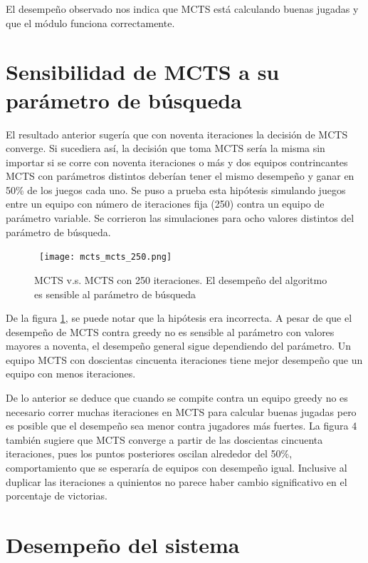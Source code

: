 El desempeño observado nos indica que MCTS está calculando buenas jugadas y que el 
módulo funciona correctamente.

\section{Sensibilidad de MCTS a su parámetro de búsqueda}

El resultado anterior sugería que con noventa iteraciones la decisión de MCTS converge. Si 
sucediera así, la decisión que toma MCTS sería la misma sin importar si se corre con 
noventa iteraciones o más y dos equipos contrincantes MCTS con parámetros distintos 
deberían tener el mismo desempeño y ganar en 50\% de los juegos cada uno. Se puso a 
prueba esta hipótesis simulando juegos entre un equipo con número de iteraciones fija 
(250) contra un equipo de parámetro variable. Se corrieron las simulaciones para ocho 
valores distintos del parámetro de búsqueda.

\begin{figure}[ht]
\begin{center}
\hbox{\hspace{-1.5em} \texttt{[image: mcts\_mcts\_250.png]}}
\caption{MCTS v.s. MCTS con 250 iteraciones. El desempeño del algoritmo es sensible al parámetro de búsqueda}
\label{MM250}
\end{center}
\end{figure}


De la figura \ref{MM250}, se puede notar que la hipótesis era incorrecta. A pesar de que el 
desempeño de MCTS contra greedy no es sensible al parámetro con valores mayores a 
noventa, el desempeño general sigue dependiendo del parámetro. Un equipo MCTS con 
doscientas cincuenta iteraciones tiene mejor desempeño que un equipo con menos 
iteraciones.

De lo anterior se deduce que cuando se compite contra un equipo greedy no es necesario 
correr muchas iteraciones en MCTS para calcular buenas jugadas pero es posible que el 
desempeño sea menor contra jugadores más fuertes. La figura 4 también sugiere que MCTS 
converge a partir de las doscientas cincuenta iteraciones, pues los puntos posteriores oscilan 
alrededor del 50\%, comportamiento que se esperaría de equipos con desempeño igual. 
Inclusive al duplicar las iteraciones a quinientos no parece haber cambio significativo en el 
porcentaje de victorias.

\section{Desempeño del sistema}

